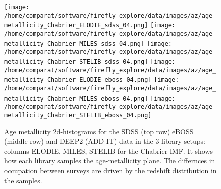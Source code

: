 \documentclass[onecolumn]{aa}
\begin{document}
\begin{figure}
\begin{center}
\caption{\label{fig:distributions:AZ} 
Age metallicity 2d-histograms for the SDSS (top row) eBOSS (middle row) and DEEP2 (ADD IT) data in the 3 library setups: columns ELODIE, MILES, STELIB for the Chabrier IMF. 
It shows how each library samples the age-metallicity plane. 
The differnces in occupation between surveys are driven by the redshift distribution in the samples.}
\texttt{[image: /home/comparat/software/firefly\_explore/data/images/az/age\_metallicity\_Chabrier\_ELODIE\_sdss\_04.png]}
\texttt{[image: /home/comparat/software/firefly\_explore/data/images/az/age\_metallicity\_Chabrier\_MILES\_sdss\_04.png]}
\texttt{[image: /home/comparat/software/firefly\_explore/data/images/az/age\_metallicity\_Chabrier\_STELIB\_sdss\_04.png]}
\texttt{[image: /home/comparat/software/firefly\_explore/data/images/az/age\_metallicity\_Chabrier\_ELODIE\_eboss\_04.png]}
\texttt{[image: /home/comparat/software/firefly\_explore/data/images/az/age\_metallicity\_Chabrier\_MILES\_eboss\_04.png]}
\texttt{[image: /home/comparat/software/firefly\_explore/data/images/az/age\_metallicity\_Chabrier\_STELIB\_eboss\_04.png]}
\end{center}
\end{figure}
\end{document}
